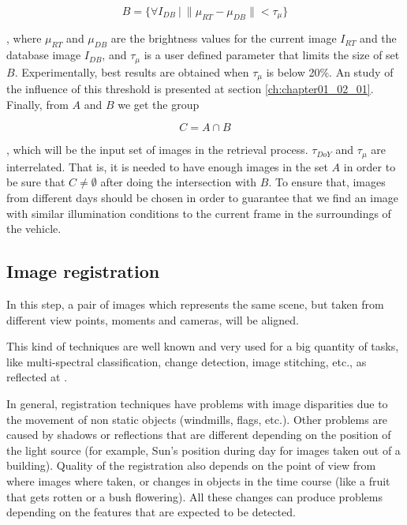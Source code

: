 \begin{equation}\label{eq:cp01_eligible_images_by_brightness}
B = \{ \forall I_{DB} ~|~ \| \mu_{RT} - \mu_{DB} \| < \tau_{\mu} \}
\end{equation}

, where $\mu_{RT}$ and $\mu_{DB}$ are the brightness values for the current image $I_{RT}$ and the database image $I_{DB}$, and $\tau_{\mu}$ is a user defined parameter that limits the size of set $B$. Experimentally, best results are obtained when $\tau_{\mu}$ is below 20\%. An study of the influence of this threshold is presented at section \ref{ch:chapter01_02_01}. Finally, from $A$ and $B$ we get the group

\begin{equation}\label{eq:cp01_eligible_images}
C = A \cap B
\end{equation}

, which will be the input set of images in the retrieval process. $\tau_{DoY}$ and $\tau_{\mu}$ are interrelated. That is, it is needed to have enough images in the set $A$ in order to be sure that $C \neq \emptyset$ after doing the intersection with $B$. To ensure that, images from different days should be chosen in order to guarantee that we find an image with similar illumination conditions to the current frame in the surroundings of the vehicle.

\subsection{Image registration}\label{ch:chapter01_01_02}

In this step, a pair of images which represents the same scene, but taken from different view points, moments and cameras, will be aligned.

This kind of techniques are well known and very used for a big quantity of tasks, like multi-spectral classification, change detection, image stitching, etc., as reflected at \cite{kooper2011stitching, singh1996digital, coppin1996digital, radke2005image, zitova2003image}.

In general, registration techniques have problems with image disparities due to the movement of non static objects (windmills, flags, etc.). Other problems are caused by shadows or reflections that are different depending on the position of the light source (for example, Sun's position during day for images taken out of a building). Quality of the registration also depends on the point of view from where images where taken, or changes in objects in the time course (like a fruit that gets rotten or a bush flowering). All these changes can produce problems depending on the features that are expected to be detected.

